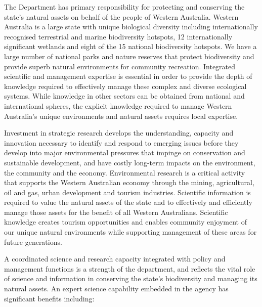 \documentclass[version=last, paper=a4, DIV=18, usenames, dvipsnames]{scrartcl}
\begin{document}
The Department has primary responsibility for protecting and conserving the state's natural assets on behalf of the people of Western Australia. Western Australia is a large state with unique biological diversity including internationally recognised terrestrial and marine biodiversity hotspots, 12 internationally significant wetlands and eight of the 15 national biodiversity hotspots. We have a large number of national parks and nature reserves that protect biodiversity and provide superb natural environments for community recreation. Integrated scientific and management expertise is essential in order to provide the depth of knowledge required to effectively manage these complex and diverse ecological systems. While knowledge in other sectors can be obtained from national and international spheres, the explicit knowledge required to manage Western Australia's unique environments and natural assets requires local expertise.


Investment in strategic research develops the understanding, capacity and innovation necessary to identify and respond to emerging issues before they develop into major environmental pressures that impinge on conservation and sustainable development, and have costly long-term impacts on the environment, the community and the economy. Environmental research is a critical activity that supports the Western Australian economy through the mining, agricultural, oil and gas, urban development and tourism industries. Scientific information is required to value the natural assets of the state and to effectively and efficiently manage those assets for the benefit of all Western Australians. Scientific knowledge creates tourism opportunities and enables community enjoyment of our unique natural environments while supporting management of these areas for future generations.


A coordinated science and research capacity integrated with policy and management functions is a strength of the department, and reflects the vital role of science and information in conserving the state's biodiversity and managing its natural assets. An expert science capability embedded in the
agency has significant benefits including:
\end{document}
